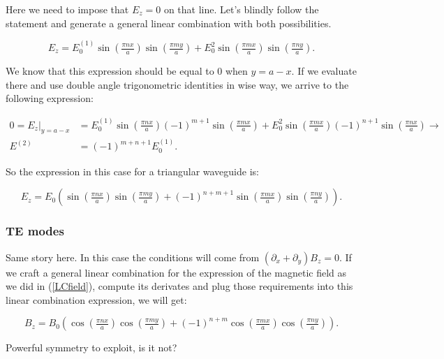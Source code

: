 Here we need to impose that $E_{z} =0$ on that line. Let's blindly follow the statement and generate a general linear combination with both possibilities.

\begin{equation}\label{LCfield}
	E_{z} = E^{(1)}_{0}\sin\left(\tfrac{\pi n x}{a}\right) \sin\left(\tfrac{\pi m y}{a}\right) + E^{2}_{0}\sin\left(\tfrac{\pi m x}{a}\right) \sin\left(\tfrac{\pi n y}{a}\right).
\end{equation}

We know that this expression should be equal to 0 when $y = a- x$.  If we evaluate there and use double angle trigonometric identities in wise way, we arrive to the following expression:

\begin{equation}
	\begin{split}
		0 = E_{z}|_{y= a- x} &= E^{(1)}_{0}\sin\left(\tfrac{\pi n x}{a}\right) (-1)^{m+1} \sin\left(\tfrac{\pi m x}{a}\right) + E^{2}_{0}\sin\left(\tfrac{\pi m x}{a}\right)(-1)^{n+1} \sin\left(\tfrac{\pi n x}{a}\right) \rightarrow\\
		E^{(2)} &= (-1)^{m+n+1} E^{(1)}_{0}.
	\end{split}
\end{equation}

So the expression in this case for a triangular waveguide is:

\begin{equation}
	E_{z} = E_{0}\left(\sin\left(\tfrac{\pi n x}{a}\right) \sin\left(\tfrac{\pi m y}{a}\right) + (-1)^{n+m+1}\sin\left(\tfrac{\pi m x}{a}\right) \sin\left(\tfrac{\pi n y}{a}\right)\right).
\end{equation}

\subsubsection*{TE modes}

Same story here. In this case the conditions will come from $(\partial_{x} + \partial_{y})B_{z} =0$. If we craft a general linear combination for the expression of the magnetic field as we did in (\ref{LCfield}), compute its derivates and plug those requirements into this linear combination expression, we will get:

\begin{equation}
	B_{z} = B_{0}\left(\cos\left(\tfrac{\pi n x}{a}\right) \cos\left(\tfrac{\pi m y}{a}\right) + (-1)^{n+m}\cos\left(\tfrac{\pi m x}{a}\right) \cos\left(\tfrac{\pi n y}{a}\right)\right).
\end{equation}

Powerful symmetry to exploit, is it not? 
	
	





